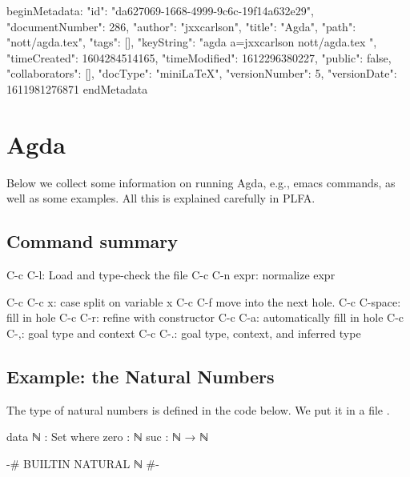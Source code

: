 beginMetadata:
{
    "id": "da627069-1668-4999-9c6c-19f14a632e29",
    "documentNumber": 286,
    "author": "jxxcarlson",
    "title": "Agda",
    "path": "nott/agda.tex",
    "tags": [],
    "keyString": "agda a=jxxcarlson nott/agda.tex ",
    "timeCreated": 1604284514165,
    "timeModified": 1612296380227,
    "public": false,
    "collaborators": [],
    "docType": "miniLaTeX",
    "versionNumber": 5,
    "versionDate": 1611981276871
}
endMetadata



\setcounter{section}{3}

\section{Agda}

\innertableofcontents



Below we collect some information on running Agda, e.g., emacs commands, as well as some examples.  All this is explained carefully in PLFA.

\subsection{Command summary}

\begin{colored}[bash]
C-c C-l: Load and type-check the file
C-c C-n expr: normalize expr

C-c C-c x: case split on variable x
C-c C-f move into the next hole.
C-c C-space: fill in hole
C-c C-r: refine with constructor
C-c C-a: automatically fill in hole
C-c C-,: goal type and context
C-c C-.: goal type, context, and inferred type
\end{colored}


\subsection{Example: the Natural Numbers}

The type of natural numbers is defined in the code below.  We put it in a file .

\begin{colored}[elm]
data ℕ : Set where
    zero : ℕ
    suc  : ℕ → ℕ
  
{-# BUILTIN NATURAL ℕ #-}
\end{colored}

